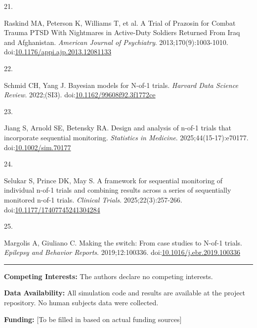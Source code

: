 \documentclass[
  11pt,
]{article}
\newlength{\cslhangindent}
\newlength{\csllabelwidth}
\newenvironment{CSLReferences}[2] %
 {\begin{list}{}{%
  \setlength{\itemindent}{0pt}
  \setlength{\leftmargin}{0pt}
  \setlength{\parsep}{0pt}
  \ifodd #1
   \setlength{\leftmargin}{\cslhangindent}
   \setlength{\itemindent}{-1\cslhangindent}
  \fi
  \setlength{\itemsep}{#2\baselineskip}}}
 {\end{list}}
\newcommand{\CSLLeftMargin}[1]{\parbox[t]{\csllabelwidth}{\strut#1\strut}}
\newcommand{\CSLRightInline}[1]{\parbox[t]{\linewidth - \csllabelwidth}{\strut#1\strut}}
\begin{document}
\begin{CSLReferences}{0}{1}
\CSLLeftMargin{21. }%
\CSLRightInline{Raskind MA, Peterson K, Williams T, et al. A {Trial} of {Prazosin} for {Combat Trauma PTSD With Nightmares} in {Active-Duty Soldiers Returned From Iraq} and {Afghanistan}. \emph{American Journal of Psychiatry}. 2013;170(9):1003-1010. doi:\href{https://doi.org/10.1176/appi.ajp.2013.12081133}{10.1176/appi.ajp.2013.12081133}}

\CSLLeftMargin{22. }%
\CSLRightInline{Schmid CH, Yang J. Bayesian models for {N}-of-1 trials. \emph{Harvard Data Science Review}. 2022;(SI3). doi:\href{https://doi.org/10.1162/99608f92.3f1772ce}{10.1162/99608f92.3f1772ce}}

\CSLLeftMargin{23. }%
\CSLRightInline{Jiang S, Arnold SE, Betensky RA. Design and analysis of n-of-1 trials that incorporate sequential monitoring. \emph{Statistics in Medicine}. 2025;44(15-17):e70177. doi:\href{https://doi.org/10.1002/sim.70177}{10.1002/sim.70177}}

\CSLLeftMargin{24. }%
\CSLRightInline{Selukar S, Prince DK, May S. A framework for sequential monitoring of individual n-of-1 trials and combining results across a series of sequentially monitored n-of-1 trials. \emph{Clinical Trials}. 2025;22(3):257-266. doi:\href{https://doi.org/10.1177/17407745241304284}{10.1177/17407745241304284}}

\CSLLeftMargin{25. }%
\CSLRightInline{Margolis A, Giuliano C. Making the switch: From case studies to {N}-of-1 trials. \emph{Epilepsy and Behavior Reports}. 2019;12:100336. doi:\href{https://doi.org/10.1016/j.ebr.2019.100336}{10.1016/j.ebr.2019.100336}}

\end{CSLReferences}

\begin{center}\rule{0.5\linewidth}{0.5pt}\end{center}

\textbf{Competing Interests:} The authors declare no competing
interests.

\textbf{Data Availability:} All simulation code and results are
available at the project repository. No human subjects data were
collected.

\textbf{Funding:} {[}To be filled in based on actual funding sources{]}
\end{document}

